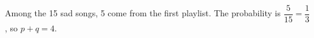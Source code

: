 Among the 15 sad songs, 5 come from the first playlist. The probability is $\dfrac{5}{15}=\dfrac{1}{3}$, so $\boxed{p+q=4}$.
